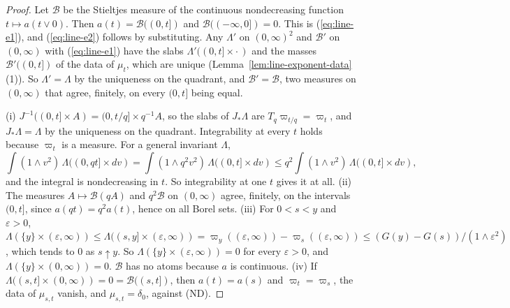 \begin{proof}
Let $\mathcal{B}$ be the Stieltjes measure of the continuous nondecreasing function
$t \mapsto a(t \vee 0)$. Then $a(t) = \mathcal{B}((0,t])$ and $\mathcal{B}((-\infty,0]) = 0$.
This is (\ref{eq:line-e1}), and (\ref{eq:line-e2}) follows by substituting. Any $\Lambda'$ on $(0,\infty)^2$ and
$\mathcal{B}'$ on $(0,\infty)$ with (\ref{eq:line-e1}) have the slabs $\Lambda'((0,t] \times \cdot\,)$ and the
masses $\mathcal{B}'((0,t])$ of the data of $\mu_t$, which are unique
(Lemma~\ref{lem:line-exponent-data}(1)). So $\Lambda' = \Lambda$ by the uniqueness on the
quadrant, and $\mathcal{B}' = \mathcal{B}$, two measures on $(0,\infty)$ that agree, finitely, on
every $(0,t]$ being equal.

(i) $J^{-1}((0,t] \times A) = (0,t/q] \times q^{-1}A$, so the slabs of $J_*\Lambda$ are
$T_q\varpi_{t/q} = \varpi_t$, and $J_*\Lambda = \Lambda$ by the uniqueness on the quadrant.
Integrability at every $t$ holds because $\varpi_t$ is a \Levy{} measure. For a general invariant
$\Lambda$,
\[
  \int(1 \wedge v^2)\,\Lambda((0,qt] \times dv) = \int(1 \wedge q^2v^2)\,\Lambda((0,t] \times dv)
  \le q^2\int(1 \wedge v^2)\,\Lambda((0,t] \times dv),
\]
and the integral is nondecreasing in $t$. So integrability at one $t$ gives it at all.
(ii) The measures $A \mapsto \mathcal{B}(qA)$ and $q^2\mathcal{B}$ on $(0,\infty)$ agree, finitely,
on the intervals $(0,t]$, since $a(qt) = q^2a(t)$, hence on all Borel sets.
(iii) For $0 < s < y$ and $\varepsilon > 0$,
$\Lambda(\{y\} \times (\varepsilon,\infty)) \le \Lambda((s,y] \times (\varepsilon,\infty))
= \varpi_y((\varepsilon,\infty)) - \varpi_s((\varepsilon,\infty))
\le (G(y) - G(s))/(1 \wedge \varepsilon^2)$, which tends to $0$ as $s \uparrow y$. So
$\Lambda(\{y\} \times (\varepsilon,\infty)) = 0$ for every $\varepsilon > 0$, and
$\Lambda(\{y\} \times (0,\infty)) = 0$. $\mathcal{B}$ has no atoms because $a$ is continuous.
(iv) If $\Lambda((s,t] \times (0,\infty)) = 0 = \mathcal{B}((s,t])$, then $a(t) = a(s)$ and
$\varpi_t = \varpi_s$, the data of $\mu_{s,t}$ vanish, and $\mu_{s,t} = \delta_0$, against (ND).


\end{proof}
